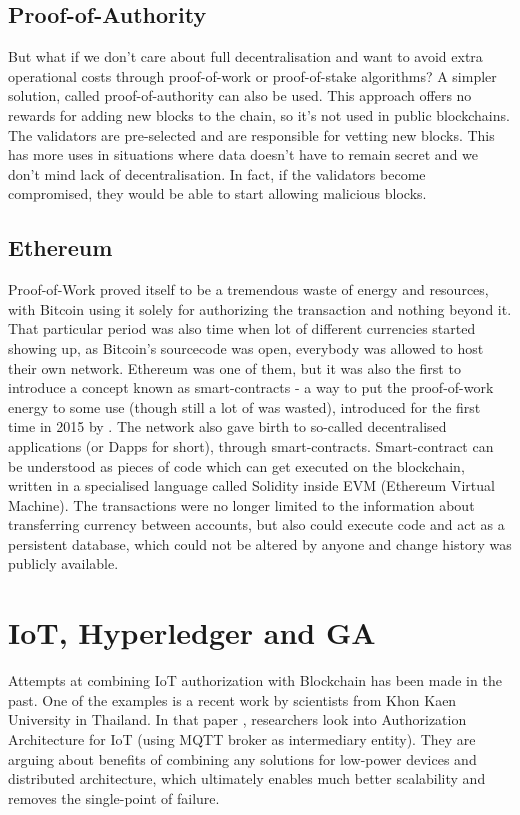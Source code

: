 \subsection{Proof-of-Authority}
But what if we don't care about full decentralisation and want to avoid extra operational costs through proof-of-work or proof-of-stake algorithms? A simpler solution, called proof-of-authority \cite{network2017proof} can also be used. This approach offers no rewards for adding new blocks to the chain, so it's not used in public blockchains. The validators are pre-selected and are responsible for vetting new blocks. This has more uses in situations where data doesn't have to remain secret and we don't mind lack of decentralisation. In fact, if the validators become compromised, they would be able to start allowing malicious blocks.
\subsection{Ethereum}
Proof-of-Work proved itself to be a tremendous waste of energy and resources, with Bitcoin using it solely for authorizing the transaction and nothing beyond it. That particular period was also time when lot of different currencies started showing up, as Bitcoin's sourcecode was open, everybody was allowed to host their own network. Ethereum was one of them, but it was also the first to introduce a concept known as smart-contracts - a way to put the proof-of-work energy to some use (though still a lot of was wasted), introduced for the first time in 2015 by \citet{buterin2014ethereum}. The network also gave birth to so-called decentralised applications (or Dapps for short), through smart-contracts. Smart-contract can be understood as pieces of code which can get executed on the blockchain, written in a specialised language called Solidity inside EVM (Ethereum Virtual Machine). The transactions were no longer limited to the information about transferring currency between accounts, but also could execute code and act as a persistent database, which could not be altered by anyone and change history was publicly available.


\section{IoT, Hyperledger and GA}

Attempts at combining IoT authorization with Blockchain has been made in the past. One of the examples is a recent work by scientists from Khon Kaen University in Thailand. In that paper \cite{klaokliang2018novel}, researchers look into Authorization Architecture for IoT (using MQTT broker as intermediary entity). They are arguing about benefits of combining any solutions for low-power devices and distributed architecture, which ultimately enables much better scalability and removes the single-point of failure.

